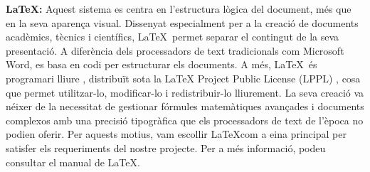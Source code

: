 \textbf{\LaTeX:} Aquest sistema es centra en l’estructura lògica del document, més que en la seva aparença visual. Dissenyat especialment per a la creació de documents acadèmics, tècnics i científics, \LaTeX\ permet separar el contingut de la seva presentació. A diferència dels processadors de text tradicionals com Microsoft Word, es basa en codi per estructurar els documents. A més, \LaTeX \ és programari lliure \cite{ProgramariLliure}, distribuït sota la LaTeX Project Public License (LPPL) \cite{LPPL}, cosa que permet utilitzar-lo, modificar-lo i redistribuir-lo lliurement. La seva creació va néixer de la necessitat de gestionar fórmules matemàtiques avançades i documents complexos amb una precisió tipogràfica que els processadors de text de l’època no podien oferir. Per aquests motius, vam escollir \LaTeX com a eina principal per satisfer els requeriments del nostre projecte. Per a més informació, podeu consultar el manual de \LaTeX \cite{ManualdeLaTeX}. \\

